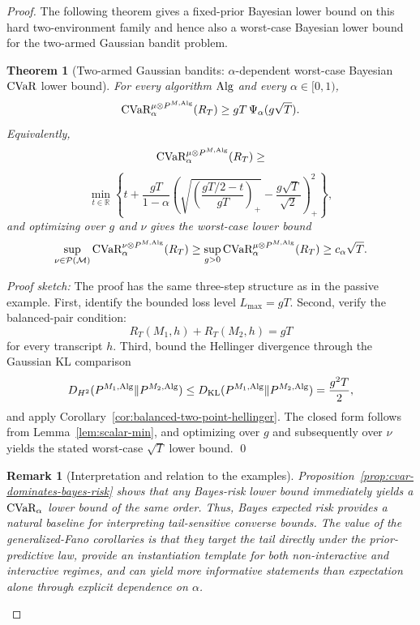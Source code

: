 \documentclass[conference]{IEEEtran}
\newtheorem{theorem}{Theorem}
\newtheorem{remark}{Remark}
\begin{document}
\begin{proof}[Proof]
The following theorem gives a fixed-prior Bayesian lower bound on this hard two-environment family and hence also a worst-case Bayesian lower bound for the two-armed Gaussian bandit problem.

\begin{theorem}[Two-armed Gaussian bandits: \(\alpha\)-dependent worst-case Bayesian \(\textup{CVaR}\) lower bound]
\label{thm:two-armed-gaussian-hellinger-cvar}
For every algorithm \(\textup{Alg}\) and every \(\alpha\in[0,1)\),
\[
\textup{CVaR}_\alpha^{\mu\otimes P^{M,\textup{Alg}}}(R_T)
\ge
gT\,\Psi_\alpha(g\sqrt{T}).
\]
Equivalently,
\[
\textup{CVaR}_\alpha^{\mu\otimes P^{M,\textup{Alg}}}(R_T)
\ge\]
\[
\min_{t\in\mathbb R}
\left\{
t+\frac{gT}{1-\alpha}
\left(
\sqrt{\left(\frac{gT/2-t}{gT}\right)_+}
-
\frac{g\sqrt{T}}{\sqrt2}
\right)_+^2
\right\},
\]
and optimizing over \(g\) and \(\nu\) gives the worst-case lower bound
\[
\sup_{\nu \in \mathcal{P}(\mathcal{M})}\textup{CVaR}_\alpha^{\nu\otimes P^{M,\textup{Alg}}}(R_T)
\ge
\sup_{g>0}\textup{CVaR}_\alpha^{\mu\otimes P^{M,\textup{Alg}}}(R_T)
\ge
c_\alpha \sqrt{T}.
\]
\end{theorem}

\textit{Proof sketch:}
The proof has the same three-step structure as in the passive example. First, identify the bounded loss level \(L_{\max}=gT\). Second, verify the balanced-pair condition:
\[
R_T(M_1,h)+R_T(M_2,h)=gT
\]
for every transcript \(h\). Third, bound the Hellinger divergence through the Gaussian KL comparison
\[
D_{H^2}(P^{M_1,\textup{Alg}}\|P^{M_2,\textup{Alg}})
\le
D_{\textup{KL}}(P^{M_1,\textup{Alg}}\|P^{M_2,\textup{Alg}})
=
\frac{g^2T}{2},
\]
and apply Corollary~\ref{cor:balanced-two-point-hellinger}. The closed form follows from Lemma~\ref{lem:scalar-min}, and optimizing over \(g\) and subsequently over \(\nu\) yields the stated worst-case \(\sqrt{T}\) lower bound. \qed

\begin{remark}[Interpretation and relation to the examples]
\label{rem:comparison-with-bayes-risk}
Proposition~\ref{prop:cvar-dominates-bayes-risk} shows that any Bayes-risk lower bound immediately yields a \(\textup{CVaR}_\alpha\) lower bound of the same order. Thus, Bayes expected risk provides a natural baseline for interpreting tail-sensitive converse bounds. The value of the generalized-Fano corollaries is that they target the tail directly under the prior-predictive law, provide an instantiation template for both non-interactive and interactive regimes, and can yield more informative statements than expectation alone through explicit dependence on \(\alpha\).


\end{remark}
\end{proof}
\end{document}
